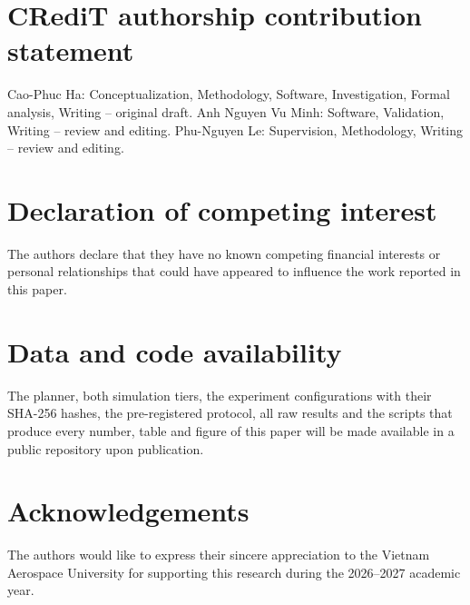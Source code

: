 \section*{CRediT authorship contribution statement}
Cao-Phuc Ha: Conceptualization, Methodology, Software, Investigation, Formal analysis, Writing -- original draft.
Anh Nguyen Vu Minh: Software, Validation, Writing -- review and editing.
Phu-Nguyen Le: Supervision, Methodology, Writing -- review and editing.

\section*{Declaration of competing interest}
The authors declare that they have no known competing financial interests or personal relationships that could have
appeared to influence the work reported in this paper.

\section*{Data and code availability}
The planner, both simulation tiers, the experiment configurations with their SHA-256 hashes, the pre-registered
protocol, all raw results and the scripts that produce every number, table and figure of this paper will be made
available in a public repository upon publication.

\section*{Acknowledgements}
The authors would like to express their sincere appreciation to the Vietnam Aerospace University for supporting this
research during the 2026--2027 academic year.
